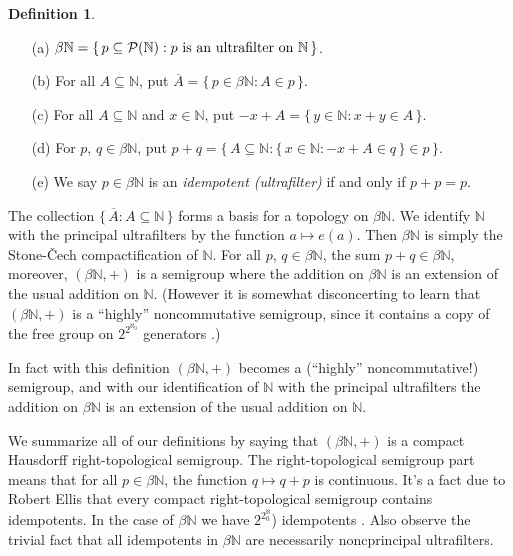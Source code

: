 \documentclass[12pt]{article}
\theoremstyle{plain}
\theoremstyle{definition}
\newtheorem{defn}[thm]{Definition}
\newcommand{\bbN}{\mathbb{N}}
\begin{document}
  \begin{defn}
    \label{defn:alg}
    \begin{itemize}
      \item[(a)] $\beta\bbN = \{\, p \subseteq \mathcal{P}(\bbN) :
        \hbox{$p$ is an ultrafilter on
        $\bbN$} \,\}$.
      \item[(b)] For all $A \subseteq \bbN$, put $\overline{A} = \{\,
        p \in \beta\bbN : A \in p \,\}$.
      \item[(c)] For all $A \subseteq \bbN$ and $x \in \bbN$, put
        $-x+A = \{\, y \in \bbN : x+y \in A \,\}$.
      \item[(d)] For $p$, $q \in \beta\bbN$, put
        $p+q = \bigl\{\, A \subseteq \bbN : \{\, x \in \bbN : -x +A \in q
        \,\} \in p \,\bigr\}$.
      \item[(e)] We say $p \in \beta\bbN$ is an \textsl{idempotent
          (ultrafilter)} if  and only if $p + p = p$.
    \end{itemize}
  \end{defn}

The collection $\{\, \overline{A} : A \subseteq \bbN \,\}$ forms a
basis for a topology on $\beta\bbN$.
We identify $\bbN$ with the principal ultrafilters by the function
$a \mapsto e(a)$. Then $\beta\bbN$ is simply the Stone-\v{C}ech
compactification of $\bbN$. 
For all $p$, $q \in \beta\bbN$, the sum $p+q \in \beta\bbN$, moreover,
$(\beta\bbN, +)$ is a semigroup where the addition on $\beta\bbN$ is
an extension of the usual addition on $\bbN$. 
(However it is somewhat disconcerting to learn that $(\beta\bbN, +)$
is a ``highly'' noncommutative semigroup, since it contains a copy of
the free group on $2^{2^{\aleph_0}}$ generators \cite[Corollary
7.36]{Hindman:1998fk}.)

In fact with this definition $(\beta\bbN, +)$ becomes a (``highly''
noncommutative!) semigroup, and with our identification of $\bbN$ with
the principal ultrafilters the addition on $\beta\bbN$ is an extension
of the usual addition on $\bbN$. 

We summarize all of our definitions by saying that $(\beta\bbN,
+)$ is a compact Hausdorff right-topological semigroup. 
The right-topological semigroup part means that for all $p \in
\beta\bbN$, the function $q \mapsto q+p$ is continuous.
It's a fact due to Robert Ellis \cite[Corollary 2.10]{Ellis:1969zr}
that every compact right-topological semigroup contains idempotents. 
In the case of $\beta\bbN$ we have 
$2^{2^\aleph_0}$) idempotents \cite[Theorem
6.44]{Hindman:1998fk}. 
Also observe the trivial fact that all idempotents in $\beta\bbN$ are
necessarily noncprincipal ultrafilters. 
\end{document}
